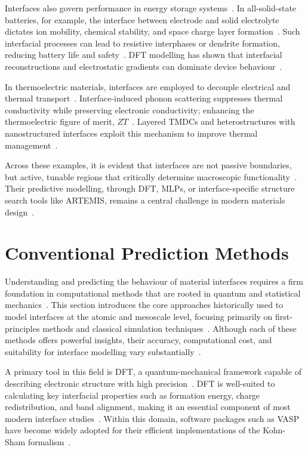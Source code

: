 \label{energy_storage_interface} Interfaces also govern performance in energy storage systems~\cite{Leitherer2023-ew}.
In all-solid-state batteries, for example, the interface between electrode and solid electrolyte dictates ion mobility, chemical stability, and space charge layer formation~\cite{Leung2020-tv, Butler2019-ws}.
Such interfacial processes can lead to resistive interphases or dendrite formation, reducing battery life and safety~\cite{Butler2019-ws, Leung2020-tv}.
DFT modelling has shown that interfacial reconstructions and electrostatic gradients can dominate device behaviour~\cite{Butler2019-ws, Leung2020-tv}.

\newpage \label{thermoelectric_interface} In thermoelectric materials, interfaces are employed to decouple electrical and thermal transport~\cite{Leitherer2023-ew}.
Interface-induced phonon scattering suppresses thermal conductivity while preserving electronic conductivity; enhancing the thermoelectric figure of merit, $ZT$~\cite{Hepplestone2010-vw}.
Layered TMDCs and heterostructures with nanostructured interfaces exploit this mechanism to improve thermal management~\cite{Low2025-on}.

\label{interfaces_active_modelling_challenge} Across these examples, it is evident that interfaces are not passive boundaries, but active, tunable regions that critically determine macroscopic functionality~\cite{Leitherer2023-ew, Di_Liberto2022-gz}.
Their predictive modelling, through DFT, MLPs, or interface-specific structure search tools like ARTEMIS, remains a central challenge in modern materials design~\nocite{}.

\newpage \section{Conventional Prediction Methods} \label{section:conventional_methods}

Understanding and predicting the behaviour of material interfaces requires a firm foundation in computational methods that are rooted in quantum and statistical mechanics~\cite{artemis_paper}.
This section introduces the core approaches historically used to model interfaces at the atomic and mesoscale level, focusing primarily on first-principles methods and classical simulation techniques~\nocite{}.
Although each of these methods offers powerful insights, their accuracy, computational cost, and suitability for interface modelling vary substantially~\nocite{}.

A primary tool in this field is DFT, a quantum-mechanical framework capable of describing electronic structure with high precision~\nocite{}.
DFT is well-suited to calculating key interfacial properties such as formation energy, charge redistribution, and band alignment, making it an essential component of most modern interface studies~\cite{Butler2019-ws}.
Within this domain, software packages such as VASP have become widely adopted for their efficient implementations of the Kohn-Sham formalism~\cite{Chagarov2015-ol, Leung2020-tv}.

